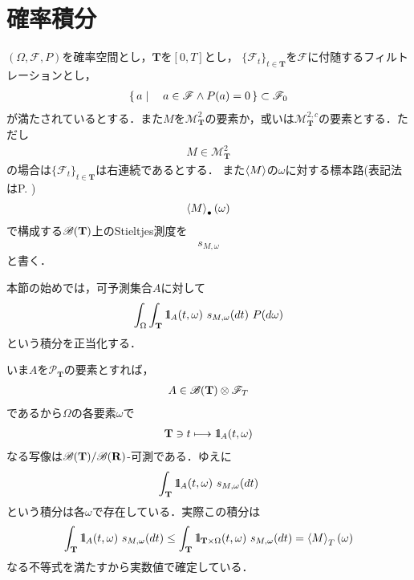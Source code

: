 \section{確率積分}
	$(\Omega,\mathscr{F},P)$を確率空間とし，$\mathbf{T}$を$[0,T]$とし，
	$\{\mathscr{F}_t\}_{t \in \mathbf{T}}$を$\mathscr{F}$に付随するフィルトレーションとし，
	\begin{align}
		\left\{\, a \mid \quad a \in \mathscr{F} \wedge P(a) = 0\, \right\} \subset \mathscr{F}_0
	\end{align}
	が満たされているとする．また$M$を$\mathscr{M}^2_{\mathbf{T}}$の要素か，或いは$\mathscr{M}^{2,c}_{\mathbf{T}}$の要素とする．ただし
	\begin{align}
		M \in \mathscr{M}^2_{\mathbf{T}}
	\end{align}
	の場合は$\{\mathscr{F}_t\}_{t \in \mathbf{T}}$は右連続であるとする．
	また$\inprod<M>$の$\omega$に対する標本路(表記法はP. \pageref{def:omega_to_path_mapping})
	\begin{align}
		\inprod<M>_\bullet(\omega)
	\end{align}
	で構成する$\mathscr{B}(\mathbf{T})$上のStieltjes測度を
	\begin{align}
		s_{M,\omega}
	\end{align}
	と書く．
	
	本節の始めでは，可予測集合$A$に対して
	\begin{align}
		\int_\Omega \int_{\mathbf{T}} \defunc_A(t,\omega)\ s_{M,\omega}(dt)\ P(d\omega)
	\end{align}
	という積分を正当化する．
	
	いま$A$を$\mathscr{P}_{\mathbf{T}}$の要素とすれば，
	\begin{align}
		A \in \mathscr{B}(\mathbf{T}) \otimes \mathscr{F}_T
	\end{align}
	であるから$\Omega$の各要素$\omega$で
	\begin{align}
		\mathbf{T} \ni t \longmapsto \mbox{1}\hspace{-0.25em}\mbox{l}_A(t,\omega)
	\end{align}
	なる写像は$\mathscr{B}(\mathbf{T})/\mathscr{B}(\mathbf{R})$-可測である．ゆえに
	\begin{align}
		\int_{\mathbf{T}} \mbox{1}\hspace{-0.25em}\mbox{l}_A(t,\omega)\ s_{M,\omega}(dt)
	\end{align}
	という積分は各$\omega$で存在している．実際この積分は
	\begin{align}
		\int_{\mathbf{T}} \defunc_A(t,\omega)\ s_{M,\omega}(dt)
		\leq \int_{\mathbf{T}} \defunc_{\mathbf{T} \times \Omega}(t,\omega)\ s_{M,\omega}(dt)
		= \inprod<M>_T(\omega)
	\end{align}
	なる不等式を満たすから実数値で確定している．
	
